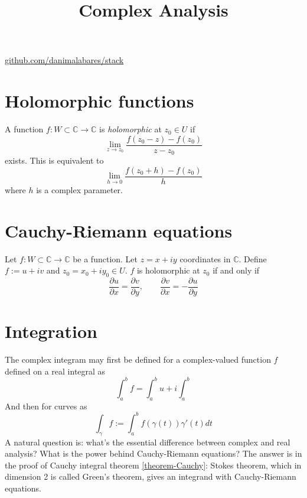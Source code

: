



\title{Complex Analysis}
\maketitle

\label{section-phantom}
\hfill
\href{http://github.com/danimalabares/stack}{github.com/danimalabares/stack}

\tableofcontents

\section{Holomorphic functions}
\label{section-holomorphic-functions}

\begin{definition}
\label{definition-holomorphic-function}
A function $f:W\subset \mathbb{C} \to \mathbb{C}$ is {\it holomorphic} at $z_0
\in U$ if
$$
\lim_{z\to z_0} \frac{f(z_0-z)-f(z_0)}{z-z_0}
$$
exists. This is equivalent to
$$
\lim_{h\to 0} \frac{f(z_0+h)-f(z_0)}{h}
$$
where $h$ is a complex parameter.
\end{definition}

\section{Cauchy-Riemann equations}
\label{section-Cauchy-Riemann-equations}

\begin{theorem}
\label{theorem-Cauchy-Riemann}
Let $f:W\subset\mathbb{C}\to \mathbb{C}$ be a function. Let $z=x+iy$ coordinates
in $\mathbb{C}$. Define $f:=u+iv$ and
$z_0=x_0+iy_0 \in U$. $f$ is holomorphic at $z_0$ if and only if
$$
\frac{\partial u}{\partial x}=\frac{\partial v}{\partial y},\qquad \frac{\partial v}{\partial x}=-\frac{\partial u}{\partial y}
$$
\end{theorem}

\section{Integration}
\label{section-integration}

The complex integram may first be defined for a complex-valued function $f$
defined on a real integral as
$$
\int_a^bf=\int_a^b u + i \int_a^b
$$
And then for curves as
$$
\int_\gamma f:=\int_a^b f(\gamma(t))\gamma'(t)dt
$$
A natural question is: what's the essential difference between complex and real
analysis? What is the power behind Cauchy-Riemann equations? The answer is in
the proof of Cauchy integral theorem \ref{theorem-Cauchy}: Stokes theorem, which
in dimension 2 is called Green's theorem, gives an integrand with Cauchy-Riemann
equations.

